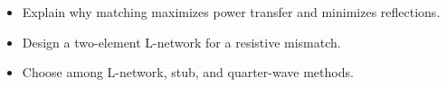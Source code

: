 \begin{objectives}
\begin{itemize}[leftmargin=1.4em,itemsep=2pt]
\item Explain why matching maximizes power transfer and minimizes reflections.
\item Design a two-element L-network for a resistive mismatch.
\item Choose among L-network, stub, and quarter-wave methods.
\end{itemize}
\end{objectives}
